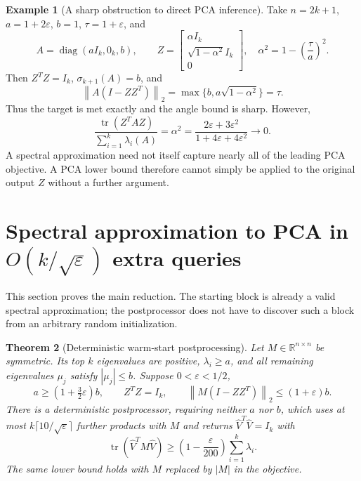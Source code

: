 \documentclass[11pt]{article}
\numberwithin{equation}{section}
\newtheorem{theorem}{Theorem}[section]
\theoremstyle{definition}
\newtheorem{example}[theorem]{Example}
\newcommand{\R}{\mathbb R}
\newcommand{\norm}[1]{\left\lVert#1\right\rVert}
\newcommand{\tr}{\operatorname{tr}}
\newcommand{\diag}{\operatorname{diag}}
\newcommand{\eps}{\varepsilon}
\begin{document}
\begin{example}[A sharp obstruction to direct PCA inference]
\label{ex:sharp}
Take $n=2k+1$, $a=1+2\eps$, $b=1$, $\tau=1+\eps$, and
\[
 A=\diag(aI_k,0_k,b),\qquad
 Z=\begin{bmatrix}\alpha I_k\\\sqrt{1-\alpha^2}I_k\\0\end{bmatrix},
 \quad \alpha^2=1-\left(\frac\tau a\right)^2.
\]
Then $Z^TZ=I_k$, $\sigma_{k+1}(A)=b$, and
\begin{equation}
 \norm{A(I-ZZ^T)}_2=\max\{b,a\sqrt{1-\alpha^2}\}=\tau.
 \label{eq:sharpresidual}
\end{equation}
Thus the target is met exactly and the angle bound is sharp. However,
\[
 \frac{\tr(Z^TAZ)}{\sum_{i=1}^k\lambda_i(A)}=\alpha^2
 =\frac{2\eps+3\eps^2}{1+4\eps+4\eps^2}\longrightarrow0.
\]
A spectral approximation need not itself capture nearly all of the leading
PCA objective. A PCA lower bound therefore cannot simply be applied to the
original output $Z$ without a further argument.
\end{example}

\section{Spectral approximation to PCA in \texorpdfstring{$O(k/\sqrt\eps)$}{O(k/sqrt(epsilon))} extra queries}
\label{sec:filter}

This section proves the main reduction. The starting block is already a
valid spectral approximation; the postprocessor does not have to discover
such a block from an arbitrary random initialization.

\begin{theorem}[Deterministic warm-start postprocessing]
\label{thm:warm}
Let $M\in\R^{n\times n}$ be symmetric. Its top $k$ eigenvalues are positive,
$\lambda_i\ge a$, and all remaining eigenvalues $\mu_j$ satisfy
$|\mu_j|\le b$. Suppose $0<\eps<1/2$,
\begin{equation}
 a\ge(1+\tfrac32\eps)b,
 \qquad Z^TZ=I_k,
 \qquad \norm{M(I-ZZ^T)}_2\le(1+\eps)b.
 \label{eq:warmassumptions}
\end{equation}
There is a deterministic postprocessor, requiring neither $a$ nor $b$, which
uses at most $k\lceil10/\sqrt\eps\rceil$ further products with $M$ and returns
$\widehat V^T\widehat V=I_k$ with
\begin{equation}
 \tr(\widehat V^TM\widehat V)
 \ge\left(1-\frac\eps{200}\right)\sum_{i=1}^k\lambda_i.
 \label{eq:warmconclusion}
\end{equation}
The same lower bound holds with $M$ replaced by $|M|$ in the objective.
\end{theorem}
\end{document}
